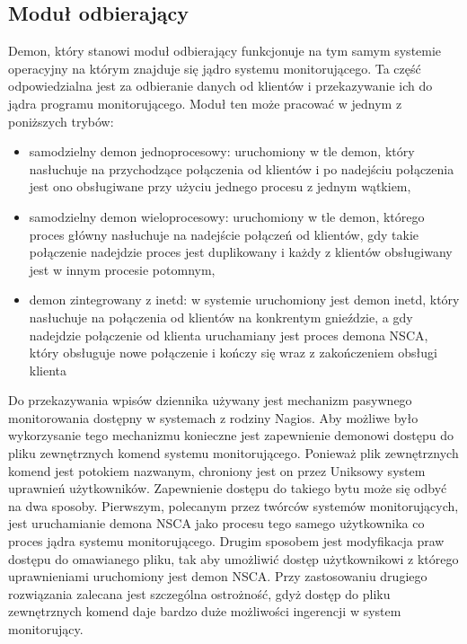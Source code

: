 \subsection[Moduł odbierający][Moduł odbierający]{Moduł odbierający}

Demon, który stanowi moduł odbierający funkcjonuje na tym samym
systemie operacyjny na którym znajduje się jądro systemu
monitorującego. Ta część odpowiedzialna jest za odbieranie danych od
klientów i przekazywanie ich do jądra programu monitorującego. Moduł
ten może pracować w jednym z poniższych trybów:

\begin{itemize}
\item samodzielny demon jednoprocesowy: uruchomiony w tle demon, który
  nasłuchuje na przychodzące połączenia od klientów i po nadejściu
  połączenia jest ono obsługiwane przy użyciu jednego procesu z jednym
  wątkiem,
\item samodzielny demon wieloprocesowy: uruchomiony w tle demon,
  którego proces główny nasłuchuje na nadejście połączeń od klientów,
  gdy takie połączenie nadejdzie proces jest duplikowany i każdy z
  klientów obsługiwany jest w innym procesie potomnym,
\item demon zintegrowany z inetd: w systemie uruchomiony jest demon
  inetd, który nasłuchuje na połączenia od klientów na konkrentym
  gnieździe, a gdy nadejdzie połączenie od klienta uruchamiany jest
  proces demona NSCA, który obsługuje nowe połączenie i kończy się
  wraz z zakończeniem obsługi klienta
\end{itemize}

Do przekazywania wpisów dziennika używany jest mechanizm pasywnego
monitorowania dostępny w systemach z rodziny Nagios. Aby możliwe było
wykorzysanie tego mechanizmu konieczne jest zapewnienie demonowi
dostępu do pliku zewnętrznych komend systemu monitorującego. Ponieważ
plik zewnętrznych komend jest potokiem nazwanym, chroniony jest on
przez Uniksowy system uprawnień użytkowników. Zapewnienie dostępu do
takiego bytu może się odbyć na dwa sposoby. Pierwszym, polecanym przez
twórców systemów monitorujących, jest uruchamianie demona NSCA jako
procesu tego samego użytkownika co proces jądra systemu
monitorującego. Drugim sposobem jest modyfikacja praw dostępu do
omawianego pliku, tak aby umożliwić dostęp użytkownikowi z którego
uprawnieniami uruchomiony jest demon NSCA. Przy zastosowaniu drugiego
rozwiązania zalecana jest szczególna ostrożność, gdyż dostęp do pliku
zewnętrznych komend daje bardzo duże możliwości ingerencji w system
monitorujący.

